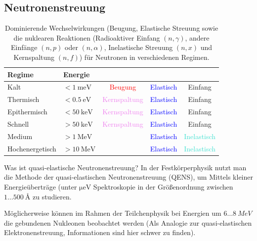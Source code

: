 \subsection{Neutronenstreuung}


\begin{table}[H]
    \centering
    \begin{tabular}{|ll|ccc|}
        \hline
        Regime & Energie & & & \\
        \hline
        Kalt & $< \SI{1}{\milli\electronvolt}$ & \textcolor{red}{Beugung} & \textcolor{blue}{Elastisch} & \textcolor{Dandelion}{Einfang} \\
        Thermisch & $< \SI{0.5}{\electronvolt}$ & \textcolor{violet}{Kernspaltung} & \textcolor{blue}{Elastisch} & \textcolor{Dandelion}{Einfang} \\
        Epithermisch & $< \SI{50}{\kilo\electronvolt}$ & \textcolor{violet}{Kernspaltung} & \textcolor{blue}{Elastisch} & \textcolor{Dandelion}{Einfang} \\
        Schnell & $> \SI{50}{\kilo\electronvolt}$ & \textcolor{violet}{Kernspaltung} & \textcolor{blue}{Elastisch} & \textcolor{Dandelion}{Einfang} \\
        Medium & $> \SI{1}{\mega\electronvolt}$ &   & \textcolor{blue}{Elastisch} & \textcolor{Turquoise}{Inelastisch} \\
        Hochenergetisch & $> \SI{10}{\mega\electronvolt}$ &   & \textcolor{blue}{Elastisch} & \textcolor{Turquoise}{Inelastisch} \\
        \hline
    \end{tabular}
    \caption{Dominierende Wechselwirkungen (Beugung, Elastische Streuung sowie die nuklearen Reaktionen (Radioaktiver Einfang $(n, \gamma)$, andere Einfänge $(n, p)$ oder $(n, \alpha)$, Inelastische Streuung $(n, x)$ und Kernspaltung $(n, f)$) für Neutronen in verschiedenen Regimen.}
\end{table}

\begin{fquestion}{Was ist quasi-elastische Neutronenstreuung?}
    In der Festkörperphysik nutzt man die Methode der quasi-elastischen Neutronenstreuung (QENS), um Mittels kleiner Energieüberträge (unter $\si{\micro\electronvolt}$ Spektroskopie in der Größenordnung zwischen $1\ldots\SI{500}{\angstrom}$ zu studieren.
    
    Möglicherweise können im Rahmen der Teilchenphysik bei Energien um $6\ldots\SI{8}{MeV}$ die gebundenen Nukleonen beobachtet werden (Als Analogie zur quasi-elastischen Elektronenstreuung, Informationen sind hier schwer zu finden).
\end{fquestion}

